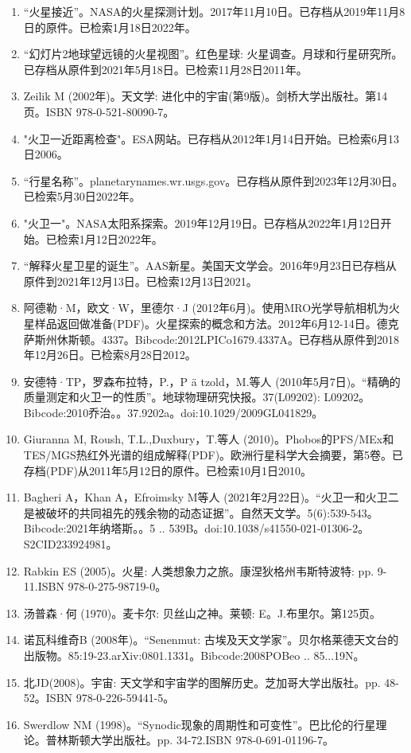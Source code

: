 \begin{enumerate}
\item “火星接近”。NASA的火星探测计划。2017年11月10日。已存档从2019年11月8日的原件。已检索1月18日2022年。
\item “幻灯片2地球望远镜的火星视图”。红色星球: 火星调查。月球和行星研究所。已存档从原件到2021年5月18日。已检索11月28日2011年。
\item Zeilik M (2002年)。天文学: 进化中的宇宙(第9版)。剑桥大学出版社。第14页。ISBN 978-0-521-80090-7。
\item "火卫一近距离检查"。ESA网站。已存档从2012年1月14日开始。已检索6月13日2006。
\item “行星名称”。planetarynames.wr.usgs.gov。已存档从原件到2023年12月30日。已检索5月30日2022年。
\item "火卫一"。NASA太阳系探索。2019年12月19日。已存档从2022年1月12日开始。已检索1月12日2022年。
\item “解释火星卫星的诞生”。AAS新星。美国天文学会。2016年9月23日已存档从原件到2021年12月13日。已检索12月13日2021。
\item 阿德勒·M，欧文·W，里德尔·J (2012年6月)。使用MRO光学导航相机为火星样品返回做准备(PDF)。火星探索的概念和方法。2012年6月12-14日。德克萨斯州休斯顿。4337。Bibcode:2012LPICo1679.4337A。已存档从原件到2018年12月26日。已检索8月28日2012。
\item 安德特·TP，罗森布拉特，P.，P ä tzold，M.等人 (2010年5月7日)。“精确的质量测定和火卫一的性质”。地球物理研究快报。37(L09202): L09202。Bibcode:2010乔治。。37.9202a。doi:10.1029/2009GL041829。
\item Giuranna M, Roush, T.L.,Duxbury，T.等人 (2010)。Phobos的PFS/MEx和TES/MGS热红外光谱的组成解释(PDF)。欧洲行星科学大会摘要，第5卷。已存档(PDF)从2011年5月12日的原件。已检索10月1日2010。
\item Bagheri A，Khan A，Efroimsky M等人 (2021年2月22日)。“火卫一和火卫二是被破坏的共同祖先的残余物的动态证据”。自然天文学。5(6):539-543。Bibcode:2021年纳塔斯。。5 .. 539B。doi:10.1038/s41550-021-01306-2。S2CID233924981。 
\item Rabkin ES (2005)。火星: 人类想象力之旅。康涅狄格州韦斯特波特: pp. 9-11.ISBN 978-0-275-98719-0。
\item 汤普森·何 (1970)。麦卡尔: 贝丝山之神。莱顿: E。J.布里尔。第125页。
\item 诺瓦科维奇B (2008年)。“Senenmut: 古埃及天文学家”。贝尔格莱德天文台的出版物。85:19-23.arXiv:0801.1331。Bibcode:2008POBeo .. 85...19N。
\item 北JD(2008)。宇宙: 天文学和宇宙学的图解历史。芝加哥大学出版社。pp. 48-52。ISBN 978-0-226-59441-5。
\item Swerdlow NM (1998)。“Synodic现象的周期性和可变性”。巴比伦的行星理论。普林斯顿大学出版社。pp. 34-72.ISBN 978-0-691-01196-7。

\end{enumerate}
